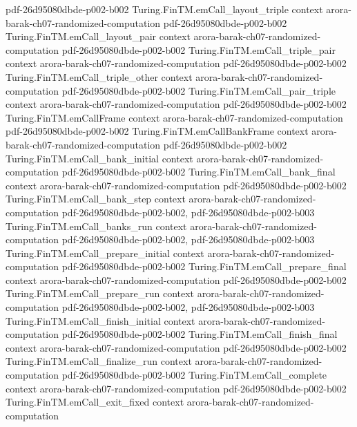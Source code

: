 \begin{theorem}
  {pdf-26d95080dbde-p002-b002}
\proofstep
  {Turing.FinTM.emCall_layout_triple}
  {context}
  {arora-barak-ch07-randomized-computation}
  {pdf-26d95080dbde-p002-b002}
\proofstep
  {Turing.FinTM.emCall_layout_pair}
  {context}
  {arora-barak-ch07-randomized-computation}
  {pdf-26d95080dbde-p002-b002}
\proofstep
  {Turing.FinTM.emCall_triple_pair}
  {context}
  {arora-barak-ch07-randomized-computation}
  {pdf-26d95080dbde-p002-b002}
\proofstep
  {Turing.FinTM.emCall_triple_other}
  {context}
  {arora-barak-ch07-randomized-computation}
  {pdf-26d95080dbde-p002-b002}
\proofstep
  {Turing.FinTM.emCall_pair_triple}
  {context}
  {arora-barak-ch07-randomized-computation}
  {pdf-26d95080dbde-p002-b002}
\proofstep
  {Turing.FinTM.emCallFrame}
  {context}
  {arora-barak-ch07-randomized-computation}
  {pdf-26d95080dbde-p002-b002}
\proofstep
  {Turing.FinTM.emCallBankFrame}
  {context}
  {arora-barak-ch07-randomized-computation}
  {pdf-26d95080dbde-p002-b002}
\proofstep
  {Turing.FinTM.emCall_bank_initial}
  {context}
  {arora-barak-ch07-randomized-computation}
  {pdf-26d95080dbde-p002-b002}
\proofstep
  {Turing.FinTM.emCall_bank_final}
  {context}
  {arora-barak-ch07-randomized-computation}
  {pdf-26d95080dbde-p002-b002}
\proofstep
  {Turing.FinTM.emCall_bank_step}
  {context}
  {arora-barak-ch07-randomized-computation}
  {pdf-26d95080dbde-p002-b002,
    pdf-26d95080dbde-p002-b003}
\proofstep
  {Turing.FinTM.emCall_banks_run}
  {context}
  {arora-barak-ch07-randomized-computation}
  {pdf-26d95080dbde-p002-b002,
    pdf-26d95080dbde-p002-b003}
\proofstep
  {Turing.FinTM.emCall_prepare_initial}
  {context}
  {arora-barak-ch07-randomized-computation}
  {pdf-26d95080dbde-p002-b002}
\proofstep
  {Turing.FinTM.emCall_prepare_final}
  {context}
  {arora-barak-ch07-randomized-computation}
  {pdf-26d95080dbde-p002-b002}
\proofstep
  {Turing.FinTM.emCall_prepare_run}
  {context}
  {arora-barak-ch07-randomized-computation}
  {pdf-26d95080dbde-p002-b002,
    pdf-26d95080dbde-p002-b003}
\proofstep
  {Turing.FinTM.emCall_finish_initial}
  {context}
  {arora-barak-ch07-randomized-computation}
  {pdf-26d95080dbde-p002-b002}
\proofstep
  {Turing.FinTM.emCall_finish_final}
  {context}
  {arora-barak-ch07-randomized-computation}
  {pdf-26d95080dbde-p002-b002}
\proofstep
  {Turing.FinTM.emCall_finalize_run}
  {context}
  {arora-barak-ch07-randomized-computation}
  {pdf-26d95080dbde-p002-b002}
\proofstep
  {Turing.FinTM.emCall_complete}
  {context}
  {arora-barak-ch07-randomized-computation}
  {pdf-26d95080dbde-p002-b002}
\proofstep
  {Turing.FinTM.emCall_exit_fixed}
  {context}
  {arora-barak-ch07-randomized-computation}

\end{theorem}
